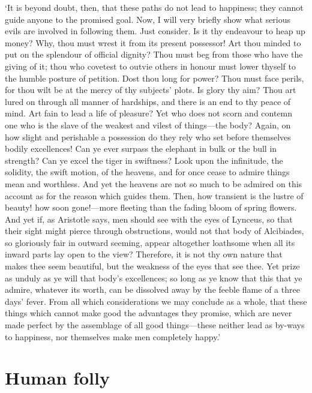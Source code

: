 \documentclass[11pt]{book}
\begin{document}
`It is beyond doubt, then, that these paths do not lead to happiness;
they cannot guide anyone to the promised goal. Now, I will very briefly
show what serious evils are involved in following them. Just consider.
Is it thy endeavour to heap up money? Why, thou must wrest it from its
present possessor! Art thou minded to put on the splendour of official
dignity? Thou must beg from those who have the giving of it; thou who
covetest to outvie others in honour must lower thyself to the humble
posture of petition. Dost thou long for power? Thou must face perils,
for thou wilt be at the mercy of thy subjects' plots. Is glory thy aim?
Thou art lured on through all manner of hardships, and there is an end
to thy peace of mind. Art fain to lead a life of pleasure? Yet who does
not scorn and contemn one who is the slave of the weakest and vilest of
things---the body? Again, on how slight and perishable a possession do
they rely who set before themselves bodily excellences! Can ye ever
surpass the elephant in bulk or the bull in strength? Can ye excel the
tiger in swiftness? Look upon the infinitude, the solidity, the swift
motion, of the heavens, and for once cease to admire things mean and
worthless. And yet the heavens are not so much to be admired on this
account as for the reason which guides them. Then, how transient is the
lustre of beauty! how soon gone!---more fleeting than the fading bloom of
spring flowers. And yet if, as Aristotle says, men should see with the
eyes of Lynceus, so that their sight might pierce through obstructions,
would not that body of Alcibiades, so gloriously fair in outward
seeming, appear altogether loathsome when all its inward parts lay open
to the view? Therefore, it is not thy own nature that makes thee seem
beautiful, but the weakness of the eyes that see thee. Yet prize as
unduly as ye will that body's excellences; so long as ye know that this
that ye admire, whatever its worth, can be dissolved away by the feeble
flame of a three days' fever. From all which considerations we may
conclude as a whole, that these things which cannot make good the
advantages they promise, which are never made perfect by the assemblage
of all good things---these neither lead as by-ways to happiness, nor
themselves make men completely happy.'




\section{Human folly}
\end{document}
